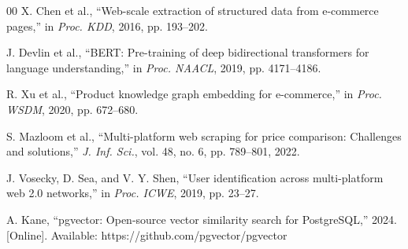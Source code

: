 \documentclass[]{IEEEtran}
\begin{document}
\begin{thebibliography}{00}
X. Chen et al., ``Web-scale extraction of structured data from e-commerce pages,'' in \textit{Proc. KDD}, 2016, pp. 193--202.

J. Devlin et al., ``BERT: Pre-training of deep bidirectional transformers for language understanding,'' in \textit{Proc. NAACL}, 2019, pp. 4171--4186.

R. Xu et al., ``Product knowledge graph embedding for e-commerce,'' in \textit{Proc. WSDM}, 2020, pp. 672--680.

S. Mazloom et al., ``Multi-platform web scraping for price comparison: Challenges and solutions,'' \textit{J. Inf. Sci.}, vol. 48, no. 6, pp. 789--801, 2022.

J. Vosecky, D. Sea, and V. Y. Shen, ``User identification across multi-platform web 2.0 networks,'' in \textit{Proc. ICWE}, 2019, pp. 23--27.

A. Kane, ``pgvector: Open-source vector similarity search for PostgreSQL,'' 2024. [Online]. Available: https://github.com/pgvector/pgvector

\end{thebibliography}
\end{document}
